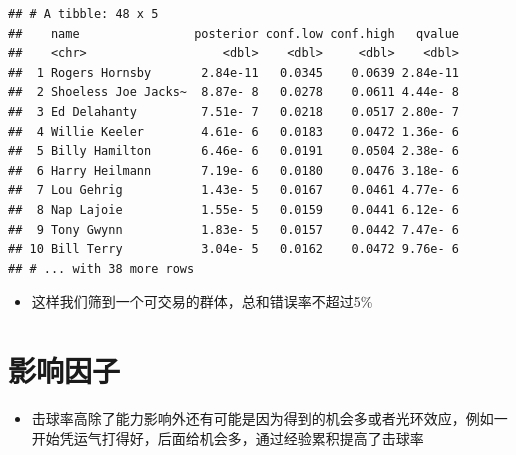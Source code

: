 \documentclass[
]{book}
\newenvironment{Shaded}{\begin{snugshade}}{\end{snugshade}}
\newcommand{\CommentTok}[1]{\textcolor[rgb]{0.56,0.35,0.01}{\textit{#1}}}
\newcommand{\DataTypeTok}[1]{\textcolor[rgb]{0.13,0.29,0.53}{#1}}
\newcommand{\FloatTok}[1]{\textcolor[rgb]{0.00,0.00,0.81}{#1}}
\newcommand{\KeywordTok}[1]{\textcolor[rgb]{0.13,0.29,0.53}{\textbf{#1}}}
\newcommand{\NormalTok}[1]{#1}
\newcommand{\OperatorTok}[1]{\textcolor[rgb]{0.81,0.36,0.00}{\textbf{#1}}}
\newcommand{\StringTok}[1]{\textcolor[rgb]{0.31,0.60,0.02}{#1}}
\providecommand{\tightlist}{%
  \setlength{\itemsep}{0pt}\setlength{\parskip}{0pt}}
\begin{document}
\begin{Shaded}
\end{Shaded}

\begin{verbatim}
## # A tibble: 48 x 5
##    name                posterior conf.low conf.high   qvalue
##    <chr>                   <dbl>    <dbl>     <dbl>    <dbl>
##  1 Rogers Hornsby       2.84e-11   0.0345    0.0639 2.84e-11
##  2 Shoeless Joe Jacks~  8.87e- 8   0.0278    0.0611 4.44e- 8
##  3 Ed Delahanty         7.51e- 7   0.0218    0.0517 2.80e- 7
##  4 Willie Keeler        4.61e- 6   0.0183    0.0472 1.36e- 6
##  5 Billy Hamilton       6.46e- 6   0.0191    0.0504 2.38e- 6
##  6 Harry Heilmann       7.19e- 6   0.0180    0.0476 3.18e- 6
##  7 Lou Gehrig           1.43e- 5   0.0167    0.0461 4.77e- 6
##  8 Nap Lajoie           1.55e- 5   0.0159    0.0441 6.12e- 6
##  9 Tony Gwynn           1.83e- 5   0.0157    0.0442 7.47e- 6
## 10 Bill Terry           3.04e- 5   0.0162    0.0472 9.76e- 6
## # ... with 38 more rows
\end{verbatim}

\begin{itemize}
\tightlist
\item
  这样我们筛到一个可交易的群体，总和错误率不超过5\%
\end{itemize}

\hypertarget{ux5f71ux54cdux56e0ux5b50}{%
\section{影响因子}\label{ux5f71ux54cdux56e0ux5b50}}

\begin{itemize}
\tightlist
\item
  击球率高除了能力影响外还有可能是因为得到的机会多或者光环效应，例如一开始凭运气打得好，后面给机会多，通过经验累积提高了击球率
\end{itemize}
\end{document}
